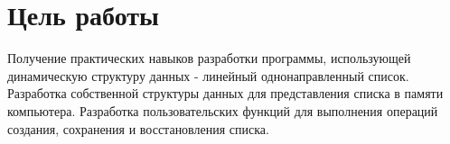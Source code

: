 \section*{Цель работы}

Получение практических навыков разработки программы,
использующей динамическую структуру данных - линейный
однонаправленный список. Разработка собственной структуры данных для
представления списка в памяти компьютера. Разработка пользовательских
функций для выполнения операций создания, сохранения и восстановления
списка.